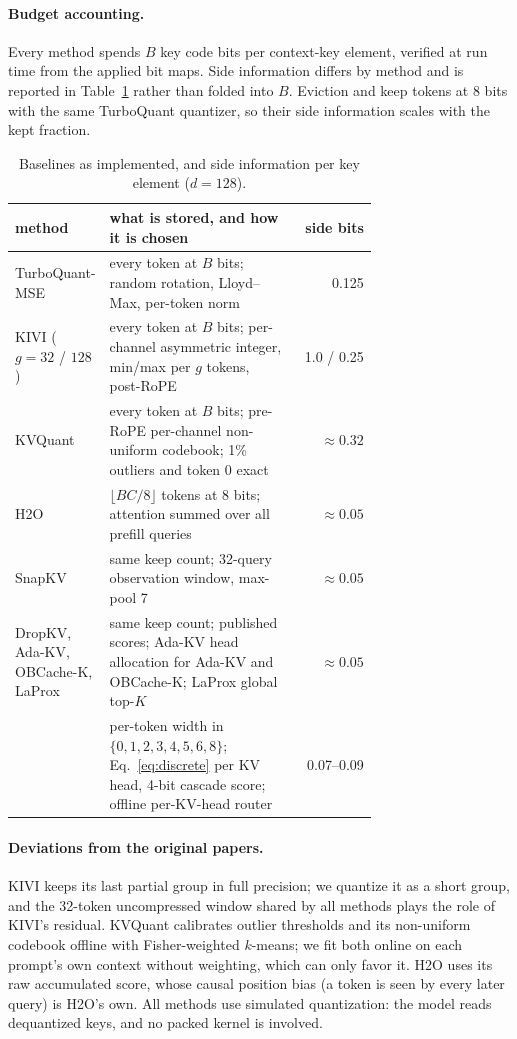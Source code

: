 \paragraph{Budget accounting.}
Every method spends $B$ key code bits per context-key element, verified at run
time from the applied bit maps.  Side information differs by method and is
reported in Table~\ref{tab:app-side} rather than folded into $B$.  Eviction and
\sieve{} keep tokens at 8 bits with the same TurboQuant quantizer, so their
side information scales with the kept fraction.

\begin{table}[h]
\centering
\small
\setlength{\tabcolsep}{4pt}
\caption{Baselines as implemented, and side information per key element ($d=128$).}
\label{tab:app-side}
\begin{tabular}{@{}p{0.2\linewidth}p{0.52\linewidth}r@{}}
\toprule
method & what is stored, and how it is chosen & side bits \\
\midrule
TurboQuant-MSE & every token at $B$ bits; random rotation, Lloyd--Max, per-token norm & 0.125 \\
KIVI ($g=32$ / $128$) & every token at $B$ bits; per-channel asymmetric integer, min/max per $g$ tokens, post-RoPE & 1.0 / 0.25 \\
KVQuant & every token at $B$ bits; pre-RoPE per-channel non-uniform codebook; 1\% outliers and token 0 exact & $\approx0.32$ \\
H2O & $\lfloor BC/8\rfloor$ tokens at 8 bits; attention summed over all prefill queries & $\approx0.05$ \\
SnapKV & same keep count; 32-query observation window, max-pool 7 & $\approx0.05$ \\
DropKV, Ada-KV, OBCache-K, LaProx & same keep count; published scores; Ada-KV head allocation for Ada-KV and OBCache-K; LaProx global top-$K$ & $\approx0.05$ \\
\sieve{} & per-token width in $\{0,1,2,3,4,5,6,8\}$; Eq.~\ref{eq:discrete} per KV head, 4-bit cascade score; offline per-KV-head router & 0.07--0.09 \\
\bottomrule
\end{tabular}
\end{table}

\paragraph{Deviations from the original papers.}
KIVI keeps its last partial group in full precision; we quantize it as a short
group, and the 32-token uncompressed window shared by all methods plays the
role of KIVI's residual.  KVQuant calibrates outlier thresholds and its
non-uniform codebook offline with Fisher-weighted $k$-means; we fit both online
on each prompt's own context without weighting, which can only favor it.  H2O
uses its raw accumulated score, whose causal position bias (a token is seen by
every later query) is H2O's own.  All methods use simulated quantization: the
model reads dequantized keys, and no packed kernel is involved.

